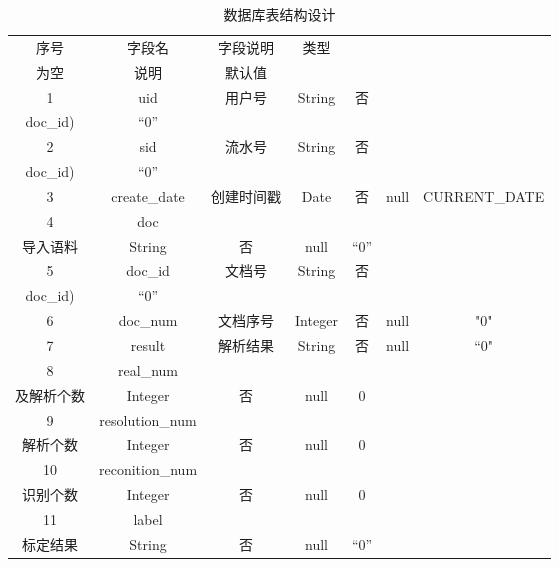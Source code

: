 \begin{table}[h]
  \centering
  \caption{数据库表结构设计}
  \begin{tabular}{|*{7}{c|}}
    \hline
    序号 & 字段名          & 字段说明                 & 类型    & \makecell*[c]{是否                                              \\为空} & 说明                  & 默认值        \\
    \hline
    1    & uid             & 用户号                   & String  & 否                 & \makecell*[c]{PK(uid, sid,                 \\doc\_id)} & “0”           \\
    \hline
    2    & sid             & 流水号                   & String  & 否                 & \makecell*[c]{PK(uid, sid,                 \\doc\_id)} & “0”           \\
    \hline
    3    & create\_date    & 创建时间戳               & Date    & 否                 & null                       & CURRENT\_DATE \\
    \hline
    4    & doc             & \makecell*[c]{用户                                                                                   \\导入语料} & String  & 否       & null                  & “0”           \\
    \hline
    5    & doc\_id         & 文档号                   & String  & 否                 & \makecell*[c]{PK(uid, sid,                 \\doc\_id)} & “0”           \\
    \hline
    6    & doc\_num        & 文档序号                 & Integer & 否                 & null                       & "0"           \\
    \hline
    7    & result          & 解析结果                 & String  & 否                 & null                       & “0"           \\
    \hline
    8    & real\_num       & \makecell*[c]{应该识别                                                                               \\及解析个数} & Integer & 否 & null & 0 \\
    \hline
    9    & resolution\_num & \makecell*[c]{实际正确                                                                               \\解析个数} & Integer & 否 & null & 0 \\
    \hline
    10   & reconition\_num & \makecell*[c]{实际正确                                                                               \\识别个数} & Integer & 否 & null  & 0 \\
    \hline
    11   & label           & \makecell*[c]{识别及解析                                                                             \\标定结果} & String & 否 & null & “0” \\
    \hline
  \end{tabular}
\end{table}

